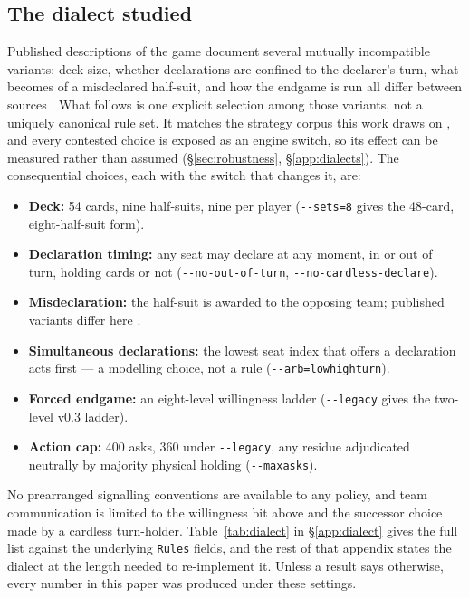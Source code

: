 \subsection{The dialect studied}
\label{sec:rules-dialect}

Published descriptions of the game document several mutually incompatible
variants: deck size, whether declarations are confined to the declarer's turn,
what becomes of a misdeclared half-suit, and how the endgame is run all differ
between sources \cite{pagat}. What follows is one explicit selection among those
variants, not a uniquely canonical rule set. It matches the strategy corpus this
work draws on \cite{develin}, and every contested choice is exposed as an engine
switch, so its effect can be measured rather than assumed
(\S\ref{sec:robustness}, \S\ref{app:dialects}). The consequential choices, each
with the switch that changes it, are:

\begin{itemize}
  \item \textbf{Deck:} 54 cards, nine half-suits, nine per player
        (\texttt{-{}-sets=8} gives the 48-card, eight-half-suit form).
  \item \textbf{Declaration timing:} any seat may declare at any moment, in or
        out of turn, holding cards or not (\texttt{-{}-no-out-of-turn},
        \texttt{-{}-no-cardless-declare}).
  \item \textbf{Misdeclaration:} the half-suit is awarded to the opposing
        team; published variants differ here \cite{pagat}.
  \item \textbf{Simultaneous declarations:} the lowest seat index that offers a
        declaration acts first --- a modelling choice, not a rule
        (\texttt{-{}-arb=low\textbar high\textbar turn}).
  \item \textbf{Forced endgame:} an eight-level willingness ladder
        (\texttt{-{}-legacy} gives the two-level v0.3 ladder).
  \item \textbf{Action cap:} 400 asks, 360 under \texttt{-{}-legacy}, any
        residue adjudicated neutrally by majority physical holding
        (\texttt{-{}-maxasks}).
\end{itemize}

No prearranged signalling conventions are available to any policy, and team
communication is limited to the willingness bit above and the successor choice
made by a cardless turn-holder.
Table~\ref{tab:dialect} in \S\ref{app:dialect} gives the full list against the
underlying \texttt{Rules} fields, and the rest of that appendix states the
dialect at the length needed to re-implement it. Unless a result says otherwise,
every number in this paper was produced under these settings.

